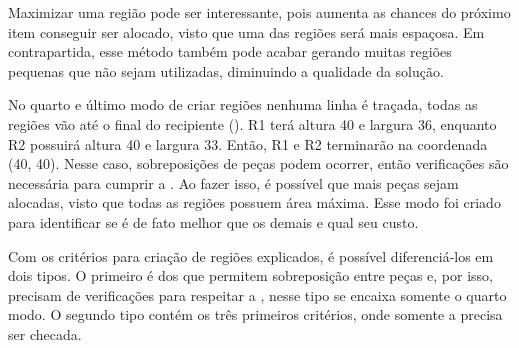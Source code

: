 

Maximizar uma região pode ser interessante, pois aumenta as chances do próximo item conseguir ser
alocado, visto que uma das regiões será mais espaçosa.
Em contrapartida, esse método também pode acabar gerando muitas regiões pequenas que não sejam
utilizadas, diminuindo a qualidade da solução.

No quarto e último modo de criar regiões nenhuma linha é traçada, todas as regiões vão até o final
do recipiente ().
R1 terá altura 40 e largura 36, enquanto R2 possuirá altura 40 e largura 33.
Então, R1 e R2 terminarão na coordenada (40, 40).
Nesse caso, sobreposições de peças podem ocorrer, então verificações são necessária para cumprir
a .
Ao fazer isso, é possível que mais peças sejam alocadas, visto que todas as regiões possuem área
máxima.
Esse modo foi criado para identificar se é de fato melhor que os demais e qual seu custo.



Com os critérios para criação de regiões explicados, é possível diferenciá-los em dois tipos.
O primeiro é dos que permitem sobreposição entre peças e, por isso, precisam de verificações para
respeitar a , nesse tipo se encaixa somente o quarto modo.
O segundo tipo contém os três primeiros critérios, onde somente a  precisa ser checada.
